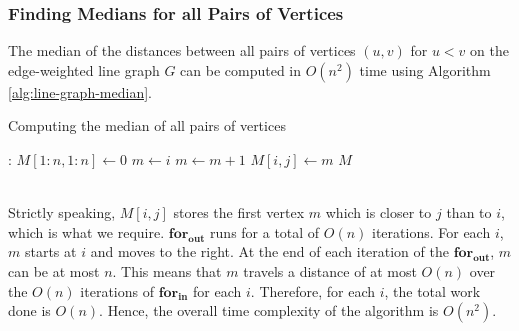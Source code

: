 \documentclass[9pt]{article}
\begin{document}
\subsubsection*{Finding Medians for all Pairs of Vertices}
The median of the distances between all pairs of vertices $(u, v)$ for $u < v$ on the edge-weighted
line graph $G$ can be computed in $O(n^{2})$ time using Algorithm \ref{alg:line-graph-median}.
\begin{algorithm}
    \caption{Computing the median of all pairs of vertices}
    \label{alg:line-graph-median}
    \begin{algorithmic}[1]
        :
            \State $M[1:n, 1:n] \gets 0$
             
                \State $m \gets i$
                 
                        \State $m \gets m + 1$
                    \EndWhile
                    \State $M[i, j] \gets m$
                \EndFor
            \EndFor
            \State \Return $M$
        \EndProcedure
    \end{algorithmic}
\end{algorithm}
\vspace*{0pt} \\
Strictly speaking, $M[i, j]$ stores the first vertex $m$ which is closer to $j$ than to $i$,
which is what we require. $\textbf{for}_{\textbf{out}}$ runs for a total of $O(n)$
iterations. For each $i$, $m$ starts at $i$ and moves to the right. At the end of each
iteration of the $\textbf{for}_{\textbf{out}}$, $m$ can be at most $n$. This means that $m$
travels a distance of at most $O(n)$ over the $O(n)$ iterations of $\textbf{for}_{\textbf{in}}$
for each $i$. Therefore, for each $i$, the total work done is $O(n)$. Hence, the overall time
complexity of the algorithm is $O(n^{2})$.
\end{document}
